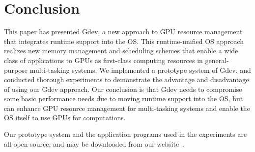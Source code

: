 \vspace{-0.25em}
\section{Conclusion}
\label{sec:conclusion}
\vspace{-0.25em}

This paper has presented Gdev, a new approach to GPU resource management
that integrates runtime support into the OS.
This runtime-unified OS approach realizes new memory management and
scheduling schemes that enable a wide class of applications to GPUs as
first-class computing resources in general-purpose multi-tasking systems.
We implemented a prototype system of Gdev, and conducted thorough
experiments to demonstrate the advantage and disadvantage of using our
Gdev approach. 
Our conclusion is that Gdev needs to compromise some basic performance
needs due to moving runtime support into the OS, but can enhance GPU
resource management for multi-tasking systems and enable the OS itself
to use GPUs for computations.

Our prototype system and the application programs used in the experiments
are all open-source, and may be downloaded from our website~\cite{Gdev}.
